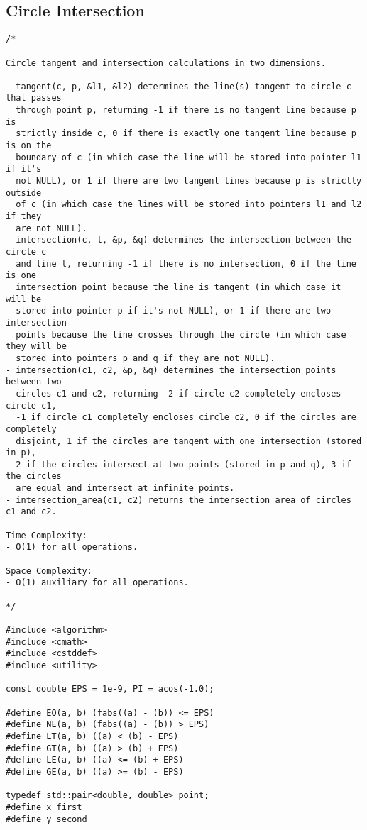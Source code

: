 \subsection{Circle Intersection}
\begin{lstlisting}
/*

Circle tangent and intersection calculations in two dimensions.

- tangent(c, p, &l1, &l2) determines the line(s) tangent to circle c that passes
  through point p, returning -1 if there is no tangent line because p is
  strictly inside c, 0 if there is exactly one tangent line because p is on the
  boundary of c (in which case the line will be stored into pointer l1 if it's
  not NULL), or 1 if there are two tangent lines because p is strictly outside
  of c (in which case the lines will be stored into pointers l1 and l2 if they
  are not NULL).
- intersection(c, l, &p, &q) determines the intersection between the circle c
  and line l, returning -1 if there is no intersection, 0 if the line is one
  intersection point because the line is tangent (in which case it will be
  stored into pointer p if it's not NULL), or 1 if there are two intersection
  points because the line crosses through the circle (in which case they will be
  stored into pointers p and q if they are not NULL).
- intersection(c1, c2, &p, &q) determines the intersection points between two
  circles c1 and c2, returning -2 if circle c2 completely encloses circle c1,
  -1 if circle c1 completely encloses circle c2, 0 if the circles are completely
  disjoint, 1 if the circles are tangent with one intersection (stored in p),
  2 if the circles intersect at two points (stored in p and q), 3 if the circles
  are equal and intersect at infinite points.
- intersection_area(c1, c2) returns the intersection area of circles c1 and c2.

Time Complexity:
- O(1) for all operations.

Space Complexity:
- O(1) auxiliary for all operations.

*/

#include <algorithm>
#include <cmath>
#include <cstddef>
#include <utility>

const double EPS = 1e-9, PI = acos(-1.0);

#define EQ(a, b) (fabs((a) - (b)) <= EPS)
#define NE(a, b) (fabs((a) - (b)) > EPS)
#define LT(a, b) ((a) < (b) - EPS)
#define GT(a, b) ((a) > (b) + EPS)
#define LE(a, b) ((a) <= (b) + EPS)
#define GE(a, b) ((a) >= (b) - EPS)

typedef std::pair<double, double> point;
#define x first
#define y second


\end{lstlisting}
